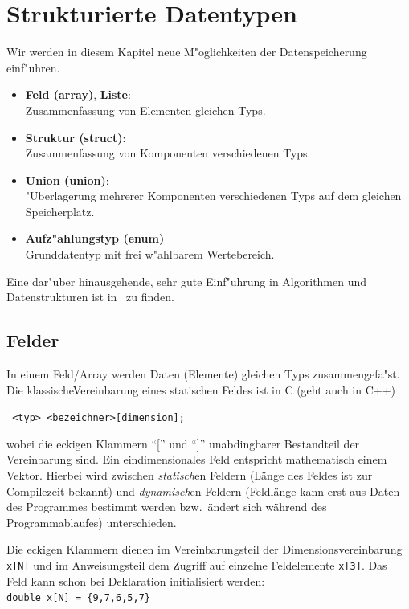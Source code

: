 \chapter{Strukturierte Datentypen}
\label{p:5}
%
%
Wir werden in diesem Kapitel neue M"oglichkeiten der Datenspeicherung
einf"uhren.
\begin{itemize}
  \item \textbf{Feld (array)}, \textbf{Liste}: \\
  	Zusammenfassung von  Elementen gleichen Typs.
  \item \textbf{Struktur (struct)}: \\
  	Zusammenfassung von Komponenten verschiedenen Typs.
  \item \textbf{Union (union)}: \\
  	"Uberlagerung mehrerer Komponenten verschiedenen Typs auf
	dem gleichen Speicherplatz.
  \item \textbf{Aufz"ahlungstyp (enum)} \\
  	Grunddatentyp mit frei w"ahlbarem Wertebereich.
\end{itemize}
%
Eine dar"uber hinausgehende, sehr gute Einf"uhrung in Algorithmen und Datenstrukturen
ist in~\cite{PombergerDobler:2008:AUD} zu finden.
%
\section{Felder}
\label{p:5.1}
%
In einem Feld/Array werden Daten (Elemente) gleichen Typs zusammengefa"st.
Die klassischeVereinbarung eines statischen Feldes ist in C (geht auch in C++)
\centerline{\texttt{ <typ> <bezeichner>[dimension];}}
%
wobei die eckigen Klammern ``['' und ``]''
unabdingbarer Bestandteil der Vereinbarung  sind.
Ein eindimensionales Feld entspricht mathematisch einem Vektor.
Hierbei wird zwischen \emph{statisch}en Feldern (Länge des Feldes ist zur Compilezeit bekannt)
und \emph{dynamisch}en Feldern (Feldlänge kann erst aus Daten des Programmes bestimmt werden bzw.\  ändert sich
während des Programmablaufes) unterschieden.
%

Die eckigen Klammern dienen im Vereinbarungsteil der Dimensionsvereinbarung
\verb|x[N]| und  im Anweisungsteil dem Zugriff auf einzelne
Feldelemente \verb|x[3]|\enspace.
Das Feld kann schon bei Deklaration initialisiert werden:
\\
\verb|double x[N] = {9,7,6,5,7}|

